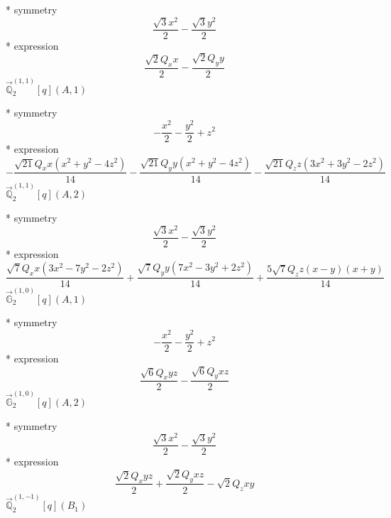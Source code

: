 \documentclass[fleqn,8pt]{jsarticle}
\begin{document}
\noindent\quad ** symmetry
\begin{dmath*}
\frac{\sqrt{3} x^{2}}{2} - \frac{\sqrt{3} y^{2}}{2}
\end{dmath*}
\noindent\quad ** expression
\begin{dmath*}
\frac{\sqrt{2} Q_{x} x}{2} - \frac{\sqrt{2} Q_{y} y}{2}
\end{dmath*}
\noindent\quad $\vec{\mathbb{Q}}_{2}^{(1,1)}[q](A,1)$

\noindent\quad ** symmetry
\begin{dmath*}
- \frac{x^{2}}{2} - \frac{y^{2}}{2} + z^{2}
\end{dmath*}
\noindent\quad ** expression
\begin{dmath*}
- \frac{\sqrt{21} Q_{x} x \left(x^{2} + y^{2} - 4 z^{2}\right)}{14} - \frac{\sqrt{21} Q_{y} y \left(x^{2} + y^{2} - 4 z^{2}\right)}{14} - \frac{\sqrt{21} Q_{z} z \left(3 x^{2} + 3 y^{2} - 2 z^{2}\right)}{14}
\end{dmath*}
\noindent\quad $\vec{\mathbb{Q}}_{2}^{(1,1)}[q](A,2)$

\noindent\quad ** symmetry
\begin{dmath*}
\frac{\sqrt{3} x^{2}}{2} - \frac{\sqrt{3} y^{2}}{2}
\end{dmath*}
\noindent\quad ** expression
\begin{dmath*}
\frac{\sqrt{7} Q_{x} x \left(3 x^{2} - 7 y^{2} - 2 z^{2}\right)}{14} + \frac{\sqrt{7} Q_{y} y \left(7 x^{2} - 3 y^{2} + 2 z^{2}\right)}{14} + \frac{5 \sqrt{7} Q_{z} z \left(x - y\right) \left(x + y\right)}{14}
\end{dmath*}
\noindent\quad $\vec{\mathbb{G}}_{2}^{(1,0)}[q](A,1)$

\noindent\quad ** symmetry
\begin{dmath*}
- \frac{x^{2}}{2} - \frac{y^{2}}{2} + z^{2}
\end{dmath*}
\noindent\quad ** expression
\begin{dmath*}
\frac{\sqrt{6} Q_{x} y z}{2} - \frac{\sqrt{6} Q_{y} x z}{2}
\end{dmath*}
\noindent\quad $\vec{\mathbb{G}}_{2}^{(1,0)}[q](A,2)$

\noindent\quad ** symmetry
\begin{dmath*}
\frac{\sqrt{3} x^{2}}{2} - \frac{\sqrt{3} y^{2}}{2}
\end{dmath*}
\noindent\quad ** expression
\begin{dmath*}
\frac{\sqrt{2} Q_{x} y z}{2} + \frac{\sqrt{2} Q_{y} x z}{2} - \sqrt{2} Q_{z} x y
\end{dmath*}
\noindent\quad $\vec{\mathbb{Q}}_{2}^{(1,-1)}[q](B_{1})$
\end{document}
